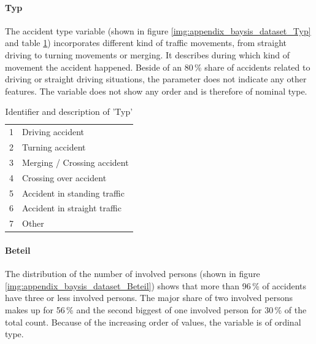 \documentclass[a4paper,headsepline,footsepline,fontsize=11pt,BCOR=12mm,DIV=12]{report}
\begin{document}
\paragraph{Typ}
The accident type variable (shown in figure \ref{img:appendix_baysis_dataset_Typ} and table \ref{table:baysis_dataset_Typ}) incorporates different kind of traffic movements, from straight driving to turning movements or merging. It describes during which kind of movement the accident happened. Beside of an 80\,\% share of accidents related to driving or straight driving situations, the parameter does not indicate any other features. The variable does not show any order and is therefore of nominal type.
\noindent
\begin{table}[h!]
	\centering
	\begin{tabular}{c|l}  
 		1 & Driving accident  \\ 
 		2 & Turning accident  \\
 		3 & Merging / Crossing accident  \\
 		4 & Crossing over accident  \\
 		5 & Accident in standing traffic  \\
 		6 & Accident in straight traffic  \\
 		7 & Other  \\
	\end{tabular}
	\caption{Identifier and description of 'Typ'}
	\label{table:baysis_dataset_Typ}
\end{table}

\paragraph{Beteil}
The distribution of the number of involved persons (shown in figure \ref{img:appendix_baysis_dataset_Beteil}) shows that more than 96\,\% of accidents have three or less involved persons. The major share of two involved persons makes up for 56\,\% and the second biggest of one involved person for 30\,\% of the total count. Because of the increasing order of values, the variable is of ordinal type.
\end{document}
